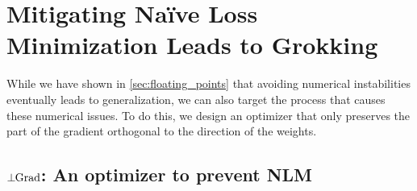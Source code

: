 \section{Mitigating Naïve Loss Minimization Leads to Grokking}
\label{sec:avoiding_nmm}

While we have shown in \cref{sec:floating_points} that avoiding numerical instabilities eventually leads to generalization, we can also target the \nlm  process that causes these numerical issues. To do this, we design an optimizer that only preserves the part of the gradient orthogonal to the direction of the weights.

\subsection{$\perp\!\mathrm{\!Grad}$: An optimizer to prevent NLM}

